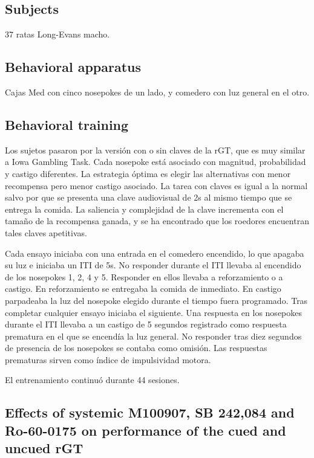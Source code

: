 \documentclass[a4paper,12pt]{article}
\begin{document}
\subsection{Subjects}

37 ratas Long-Evans macho.

\subsection{Behavioral apparatus}

Cajas Med con cinco nosepokes de un lado, y comedero con luz general en el otro.

\subsection{Behavioral training}

Los sujetos pasaron por la versión con o sin claves de la rGT, que es muy similar a Iowa Gambling Task. Cada nosepoke está asociado con magnitud, probabilidad y castigo diferentes. La estrategia óptima es elegir las alternativas con menor recompensa pero menor castigo asociado. La tarea con claves es igual a la normal salvo por que se presenta una clave audiovisual de 2s al mismo tiempo que se entrega la comida. La saliencia y complejidad de la clave incrementa con el tamaño de la recompensa ganada, y se ha encontrado que los roedores encuentran tales claves apetitivas.

Cada ensayo iniciaba con una entrada en el comedero encendido, lo que apagaba su luz e iniciaba un ITI de 5s. No responder durante el ITI llevaba al encendido de los nosepokes 1, 2, 4 y 5. Responder en ellos llevaba a reforzamiento o a castigo. En reforzamiento se entregaba la comida de inmediato. En castigo parpadeaba la luz del nosepoke elegido durante el tiempo fuera programado. Tras completar cualquier ensayo iniciaba el siguiente. Una respuesta en los nosepokes durante el ITI llevaba a un castigo de 5 segundos registrado como respuesta prematura en el que se encendía la luz general. No responder tras diez segundos de presencia de los nosepokes se contaba como omisión. Las respuestas prematuras sirven como índice de impulsividad motora.

El entrenamiento continuó durante 44 sesiones.

\subsection{Effects of systemic M100907, SB 242,084 and Ro-60-0175 on performance of the cued and uncued rGT}
\end{document}
